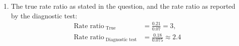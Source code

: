 \documentclass[12pt,a4paper,twoside]{article}
\begin{document}
\begin{enumerate}[label=\bfseries Q\arabic*.]
\begin{enumerate}
  \item 
    The true rate ratio as stated in the question, and the rate ratio
    as reported by the diagnostic test:
    \begin{align*} 
      \text{Rate ratio}_{\text{ True}} &= \frac{0.21}{0.07} = 3,\\
      \text{Rate ratio}_{\text{ Diagnostic test}} &= \frac{0.18}{0.075} \approx 2.4                                          \end{align*}
  
  \end{enumerate}
\end{enumerate}
\end{document}
